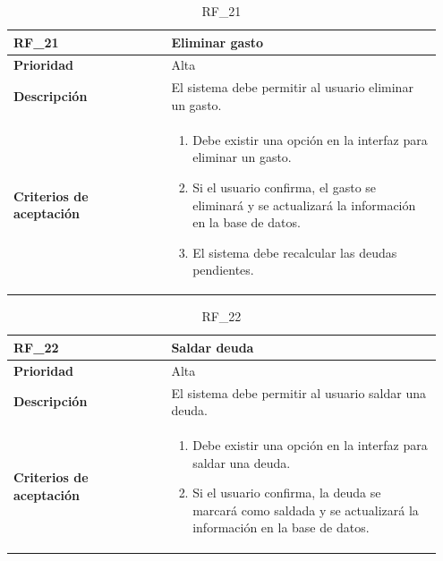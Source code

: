 \begin{table}[htb!]
    \begin{tabular}{|p{0.35\linewidth}|p{0.6\linewidth}|}
        \hline
        \rowcolor[HTML]{C0C0C0}  
        \textbf{RF\_21} & \textbf{Eliminar gasto} \\
        \hline
        \textbf{Prioridad} & Alta \\
        \hline
        \textbf{Descripción} & El sistema debe permitir al usuario eliminar un gasto.  \\
        \hline
        \vspace{0.5mm}
        \textbf{Criterios de aceptación} & 
        \begin{minipage}[t]{0.9\linewidth}
            \begin{enumerate}
                \item Debe existir una opción en la interfaz para eliminar un gasto.
                \item Si el usuario confirma, el gasto se eliminará y se actualizará la información en la base de datos.
                \item El sistema debe recalcular las deudas pendientes.
            \end{enumerate}
            \vspace{2mm}
        \end{minipage} \\
        \hline
    \end{tabular}
    \caption{RF\_21}
    \label{req:RF21}
\end{table}

\begin{table}[htb!]
    \begin{tabular}{|p{0.35\linewidth}|p{0.6\linewidth}|}
        \hline
        \rowcolor[HTML]{C0C0C0}  
        \textbf{RF\_22} & \textbf{Saldar deuda} \\
        \hline
        \textbf{Prioridad} & Alta \\
        \hline
        \textbf{Descripción} & El sistema debe permitir al usuario saldar una deuda.  \\
        \hline
        \vspace{0.5mm}
        \textbf{Criterios de aceptación} & 
        \begin{minipage}[t]{0.9\linewidth}
            \begin{enumerate}
                \item Debe existir una opción en la interfaz para saldar una deuda.
                \item Si el usuario confirma, la deuda se marcará como saldada y se actualizará la información en la base de datos.
            \end{enumerate}
            \vspace{2mm}
        \end{minipage} \\
        \hline
    \end{tabular}
    \caption{RF\_22}
    \label{req:RF22}
\end{table}

